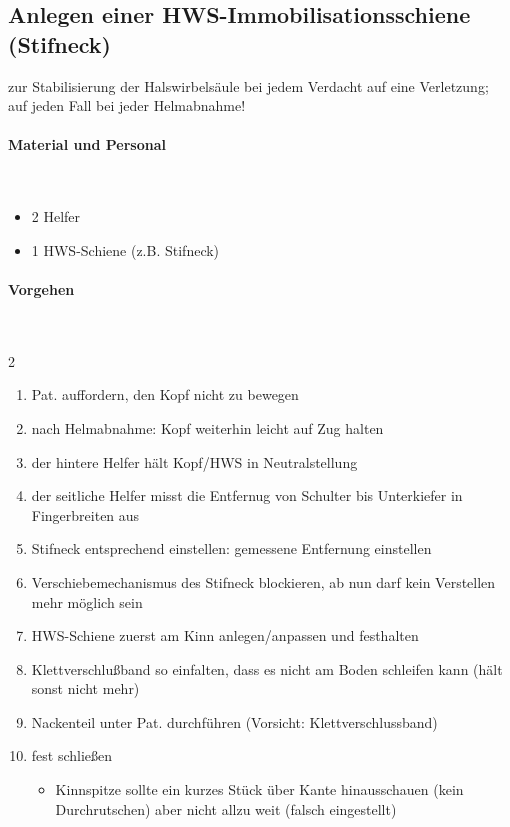 \subsection{Anlegen einer
HWS-Immobilisationsschiene (Stifneck\texttrademark)}
\label{topic:hws-schiene-anlegen}

zur Stabilisierung der Halswirbelsäule bei jedem Verdacht auf eine
Verletzung; auf jeden Fall bei jeder Helmabnahme!

\paragraph*{Material und Personal}~

\begin{itemize}
    \item 2 Helfer
    \item 1 HWS-Schiene (z.B. Stifneck\texttrademark)
\end{itemize}

\paragraph*{Vorgehen}~

\begin{multicols}{2}
\begin{enumerate}
    \item Pat. auffordern, den Kopf nicht zu bewegen
    \item nach Helmabnahme: Kopf weiterhin leicht auf Zug halten
    \item der hintere Helfer hält Kopf/HWS in Neutralstellung
    \item der seitliche Helfer misst die Entfernug von Schulter bis
    Unterkiefer in Fingerbreiten aus
    \item Stifneck entsprechend einstellen: gemessene Entfernung einstellen
    \item Verschiebemechanismus des Stifneck blockieren, ab nun darf kein
    Verstellen mehr möglich  sein
    \item HWS-Schiene zuerst am Kinn anlegen/anpassen und
    festhalten
    \item Klettverschlußband so einfalten, dass es nicht am Boden
    schleifen kann (hält sonst nicht mehr)
    \item Nackenteil unter Pat. durchführen (Vorsicht:
    Klettverschlussband)
    \item fest schließen
    \begin{itemize}
        \item[] Kinnspitze sollte ein kurzes Stück über Kante hinausschauen
        (kein Durchrutschen) aber nicht allzu weit (falsch eingestellt)
    \end{itemize}
\end{enumerate}
\end{multicols}


